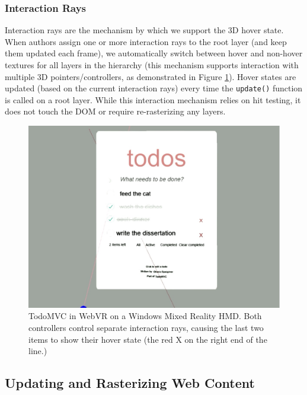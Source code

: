 \documentclass[sigconf]{acmart}
\begin{document}
\subsubsection{Interaction Rays}
\label{sec:rays}
Interaction rays are the mechanism by which we support the 3D hover state. When authors assign one or more interaction rays to the root layer (and keep them updated each frame), we automatically switch between hover and non-hover textures for all layers in the hierarchy (this mechanism supports interaction with multiple 3D pointers/controllers, as demonstrated in Figure \ref{fig:dualInput}). Hover states are updated (based on the current interaction rays) every time the \verb|update()| function is called on a root layer. While this interaction mechanism relies on hit testing, it does not touch the DOM or require re-rasterizing any layers.

\begin{figure}[h]
  \centering
  \includegraphics[width=\linewidth]{TodoMVC-dualInput.jpg}
  \caption{TodoMVC in WebVR on a Windows Mixed Reality HMD. Both controllers control separate interaction rays, causing the last two items to show their hover state (the red X on the right end of the line.) }
  \Description{}
  \label{fig:dualInput}
\end{figure}

\subsection{Updating and Rasterizing Web Content}
\end{document}
